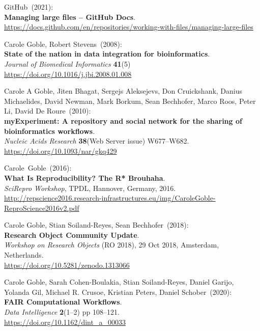 \begin{thebibliography}{9}
GitHub~(2021): \\
\textbf{Managing large files -- GitHub Docs}.\\
\url{https://docs.github.com/en/repositories/working-with-files/managing-large-files}

Carole Goble, Robert Stevens~(2008): \\
\textbf{State of the nation in data integration for bioinformatics}.\\
\emph{Journal of Biomedical Informatics} \textbf{41}(5) \\
\url{https://doi.org/10.1016/j.jbi.2008.01.008}

Carole A Goble, Jiten Bhagat, Sergejs Aleksejevs, Don
Cruickshank, Danius Michaelides, David Newman, Mark Borkum, Sean
Bechhofer, Marco Roos, Peter Li, David De Roure~(2010): \\
\textbf{myExperiment: A repository and social network for the sharing of bioinformatics workflows}.\\
\emph{Nucleic Acids Research} \textbf{38}(Web Server issue)
W677--W682.\\
\url{https://doi.org/10.1093/nar/gkq429}

Carole~Goble~(2016): \\
\textbf{What Is Reproducibility? The R* Brouhaha}.\\
\emph{SciRepro Workshop}, TPDL, Hannover, Germany, 2016.\\
\url{http://repscience2016.research-infrastructures.eu/img/CaroleGoble-ReproScience2016v2.pdf}

Carole Goble, Stian Soiland-Reyes, Sean Bechhofer~(2018): \\
\textbf{Research Object Community Update}.\\
\emph{Workshop on Research Objects} (RO 2018), 29 Oct 2018, Amsterdam, Netherlands.\\
\url{https://doi.org/10.5281/zenodo.1313066}

Carole Goble, Sarah Cohen-Boulakia, Stian Soiland-Reyes, Daniel
Garijo, Yolanda Gil, Michael R. Crusoe, Kristian Peters, Daniel Schober~(2020): \\
\textbf{FAIR Computational Workflows}.\\
\emph{Data Intelligence} \textbf{2}(1--2) pp 108--121.\\
\url{https://doi.org/10.1162/dint_a_00033}


\end{thebibliography}

